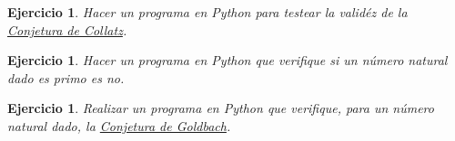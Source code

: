 \documentclass{article}
\newcounter{ejer}
\newtheorem{ejercicio}[ejer]{Ejercicio}}
\begin{document}
\begin{ejercicio} Hacer un programa en Python  para testear la valid\'ez de la \href{http://es.wikipedia.org/wiki/Conjetura_de_Collatz}{Conjetura de Collatz}.

\end{ejercicio}

\begin{ejercicio}
Hacer un programa en Python que verifique si un n\'umero natural dado es primo es no.
\end{ejercicio}

\begin{ejercicio}
Realizar un programa en Python que verifique, para un n\'umero natural dado, la \href{https://es.wikipedia.org/wiki/Conjetura_de_Goldbach}{Conjetura de Goldbach}.

 
\end{ejercicio}


%
%
\end{document}
